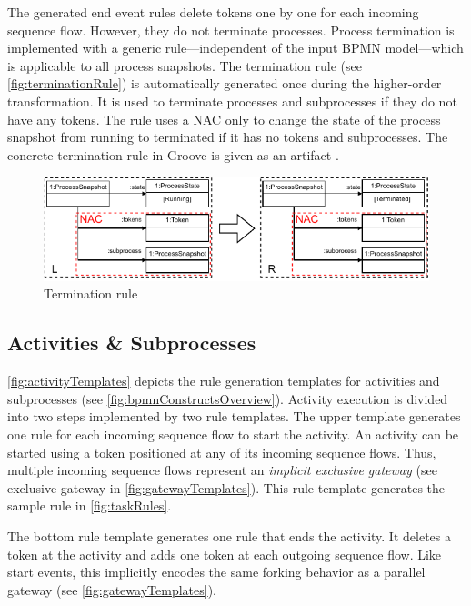 \documentclass[runningheads]{llncs}
\begin{document}
The generated end event rules delete tokens one by one for each incoming sequence flow.
However, they do not terminate processes.
Process termination is implemented with a generic rule---independent of the input BPMN model---which is applicable to all process snapshots.
The termination rule (see \autoref{fig:terminationRule}) is automatically generated once during the higher-order transformation.
It is used to terminate processes and subprocesses if they do not have any tokens.
The rule uses a NAC only to change the state of the process snapshot from running to terminated if it has no tokens and subprocesses.
The concrete termination rule in Groove is given as an artifact \cite{krauterArtifactsICGT2023}.

\begin{figure}[ht]
    \centering
    \includegraphics[width=.8\textwidth]{images/bpmn_semantics-termination_rule.pdf}
    \caption{Termination rule}
    \label{fig:terminationRule}
\end{figure}

\subsection{Activities \& Subprocesses}

\autoref{fig:activityTemplates} depicts the rule generation templates for activities and subprocesses (see \autoref{fig:bpmnConstructsOverview}).
Activity execution is divided into two steps implemented by two rule templates.
The upper template generates one rule for each incoming sequence flow to start the activity.
An activity can be started using a token positioned at any of its incoming sequence flows.
Thus, multiple incoming sequence flows represent an \textit{implicit exclusive gateway} (see exclusive gateway in \autoref{fig:gatewayTemplates}).
This rule template generates the sample rule in \autoref{fig:taskRules}.

The bottom rule template generates one rule that ends the activity.
It deletes a token at the activity and adds one token at each outgoing sequence flow.
Like start events, this implicitly encodes the same forking behavior as a parallel gateway (see \autoref{fig:gatewayTemplates}). 
\end{document}
